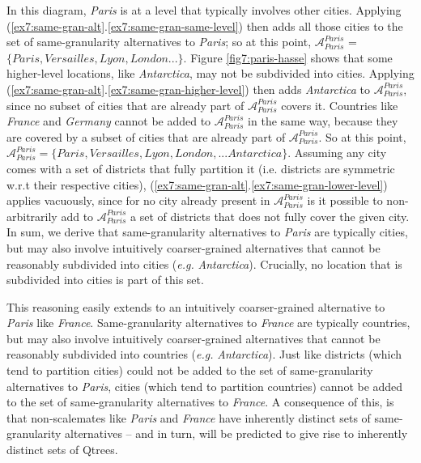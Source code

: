In this diagram, \textit{Paris} is at a level that typically involves other cities. Applying (\ref{ex7:same-gran-alt}.\ref{ex7:same-gran-same-level}) then adds all those cities to the set of same-granularity alternatives to \textit{Paris}; so at this point, $\mathcal{A}_{\textit{Paris}}^{\textit{Paris}}$ = $\lbrace \textit{Paris}, \textit{Versailles}, \textit{Lyon}, \textit{London} ...\rbrace$. Figure \ref{fig7:paris-hasse} shows that some higher-level locations, like \textit{Antarctica}, may not be subdivided into cities. Applying (\ref{ex7:same-gran-alt}.\ref{ex7:same-gran-higher-level}) then adds \textit{Antarctica} to $\mathcal{A}_{\textit{Paris}}^{\textit{Paris}}$, since no subset of cities that are already part of $\mathcal{A}_{\textit{Paris}}^{\textit{Paris}}$ covers it. Countries like \textit{France} and \textit{Germany} cannot be added to $\mathcal{A}_{\textit{Paris}}^{\textit{Paris}}$ in the same way, because they are covered by a subset of cities that are already part of $\mathcal{A}_{\textit{Paris}}^{\textit{Paris}}$. So at this point, $\mathcal{A}_{\textit{Paris}}^{\textit{Paris}} = \lbrace \textit{Paris}, \textit{Versailles}, \textit{Lyon}, \textit{London}, ...  \textit{Antarctica}\rbrace$. Assuming any city comes with a set of districts that fully partition it (i.e. districts are symmetric w.r.t their respective cities), (\ref{ex7:same-gran-alt}.\ref{ex7:same-gran-lower-level}) applies vacuously, since for no city already present in $\mathcal{A}_{\textit{Paris}}^{\textit{Paris}}$ is it possible to non-arbitrarily add to $\mathcal{A}_{\textit{Paris}}^{\textit{Paris}}$ a set of districts that does not fully cover the given city. In sum, we derive that same-granularity alternatives to \textit{Paris} are typically cities, but may also involve intuitively coarser-grained alternatives that cannot be reasonably subdivided into cities (\textit{e.g.} \textit{Antarctica}). Crucially, no location that is subdivided into cities is part of this set.

This reasoning easily extends to an intuitively coarser-grained alternative to \textit{Paris} like \textit{France}. Same-granularity alternatives to \textit{France} are typically countries, but may also involve intuitively coarser-grained alternatives that cannot be reasonably subdivided into countries (\textit{e.g.} \textit{Antarctica}). Just like districts (which tend to partition cities) could not be added to the set of same-granularity alternatives to \textit{Paris}, cities (which tend to partition countries) cannot be added to the set of same-granularity alternatives to \textit{France}. A consequence of this, is that non-scalemates like \textit{Paris} and \textit{France} have inherently distinct sets of same-granularity alternatives -- and in turn, will be predicted to give rise to inherently distinct sets of Qtrees.


